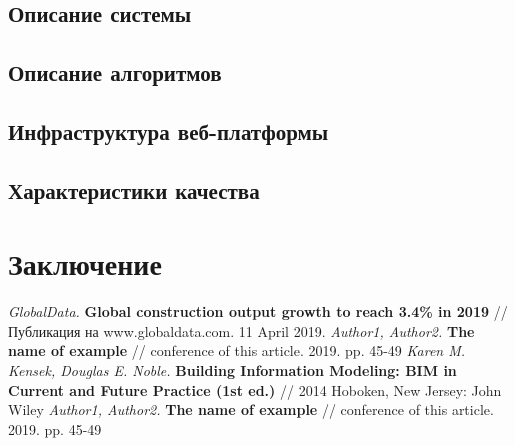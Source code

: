 \documentclass[a4paper,14pt]{extreport} %
\begin{document}
\newpage
\section{Описание системы}


\newpage
\section{Описание алгоритмов}


\newpage
\section{Инфраструктура веб-платформы}


\newpage
\section{Характеристики качества}


\newpage
\chapter{Заключение}

\begin{thebibliography}{1}
{\small
{} {\it GlobalData.}
\textbf{Global construction output growth to reach 3.4\% in 2019} // Публикация на www.globaldata.com. 11 April 2019.
 {\it Author1, Author2.}
\textbf{The name of example} // conference of this article. 2019. pp. 45-49
 {\it Karen M. Kensek, Douglas E. Noble.}
\textbf{Building Information Modeling: BIM in Current and Future Practice (1st ed.)} // 2014 Hoboken, New Jersey: John Wiley
 {\it Author1, Author2.}
\textbf{The name of example} // conference of this article. 2019. pp. 45-49
}
\end{thebibliography}
\end{document}
